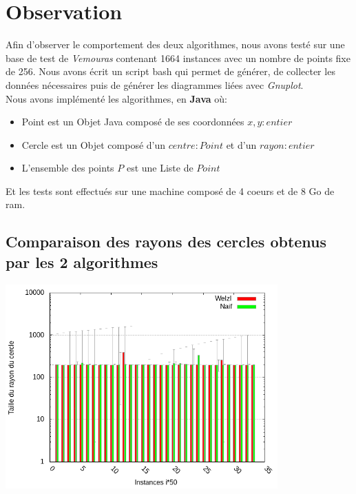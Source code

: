 \documentclass[12pt, a4paper, titlepage]{article}
\begin{document}
\section{Observation}
    Afin d'observer le comportement des deux algorithmes, nous avons testé sur une base de test de \textit{Vemouras} contenant 1664 instances avec un nombre de points fixe de 256. Nous avons écrit un script bash qui permet de générer, de collecter les données nécessaires puis de générer les diagrammes liées avec \textit{Gnuplot}.\\
    Nous avons implémenté les algorithmes, en \textbf{Java} où:
    \begin{itemize}
        \item Point est un Objet Java composé de ses coordonnées $x,y: entier$
        \item Cercle est un Objet composé d'un $centre : Point$ et d'un $rayon: entier$
        \item L'ensemble des points $P$ est une Liste de $Point$
    \end{itemize}
    Et les tests sont effectués sur une machine composé de 4 coeurs et de 8 Go de ram.
    \subsection{Comparaison des rayons des cercles obtenus par les 2 algorithmes}
    \includegraphics[width=395px,
                     keepaspectratio,]{testResult.png}
    
\end{document}
